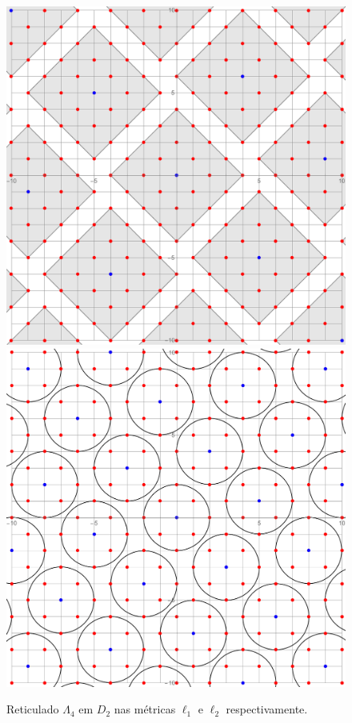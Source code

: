 \documentclass{article}
\theoremstyle{plain}
\theoremstyle{definition}
\theoremstyle{remark}
\begin{document}
  \begin{figure}[!ht]
    \centering
        \includegraphics[scale=0.24]{newcoder4l1.pdf}\;\;\;\;\includegraphics[scale=0.2]{newcoder2l2.pdf}
        \caption{Reticulado $\Lambda_4$ em $D_2$ nas métricas $\ell_1$ e $\ell_2$ respectivamente.}
  \end{figure}
\end{document}
